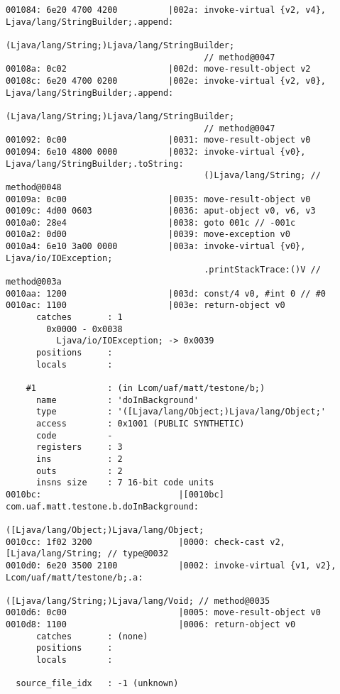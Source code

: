 \begin{lstlisting}
001084: 6e20 4700 4200          |002a: invoke-virtual {v2, v4}, Ljava/lang/StringBuilder;.append:
                                       (Ljava/lang/String;)Ljava/lang/StringBuilder;
                                       // method@0047
00108a: 0c02                    |002d: move-result-object v2
00108c: 6e20 4700 0200          |002e: invoke-virtual {v2, v0}, Ljava/lang/StringBuilder;.append:
                                       (Ljava/lang/String;)Ljava/lang/StringBuilder;
                                       // method@0047
001092: 0c00                    |0031: move-result-object v0
001094: 6e10 4800 0000          |0032: invoke-virtual {v0}, Ljava/lang/StringBuilder;.toString:
                                       ()Ljava/lang/String; // method@0048
00109a: 0c00                    |0035: move-result-object v0
00109c: 4d00 0603               |0036: aput-object v0, v6, v3
0010a0: 28e4                    |0038: goto 001c // -001c
0010a2: 0d00                    |0039: move-exception v0
0010a4: 6e10 3a00 0000          |003a: invoke-virtual {v0}, Ljava/io/IOException;
                                       .printStackTrace:()V // method@003a
0010aa: 1200                    |003d: const/4 v0, #int 0 // #0
0010ac: 1100                    |003e: return-object v0
      catches       : 1
        0x0000 - 0x0038
          Ljava/io/IOException; -> 0x0039
      positions     :
      locals        :

    #1              : (in Lcom/uaf/matt/testone/b;)
      name          : 'doInBackground'
      type          : '([Ljava/lang/Object;)Ljava/lang/Object;'
      access        : 0x1001 (PUBLIC SYNTHETIC)
      code          -
      registers     : 3
      ins           : 2
      outs          : 2
      insns size    : 7 16-bit code units
0010bc:                           |[0010bc] com.uaf.matt.testone.b.doInBackground:
                                            ([Ljava/lang/Object;)Ljava/lang/Object;
0010cc: 1f02 3200                 |0000: check-cast v2, [Ljava/lang/String; // type@0032
0010d0: 6e20 3500 2100            |0002: invoke-virtual {v1, v2}, Lcom/uaf/matt/testone/b;.a:
                                         ([Ljava/lang/String;)Ljava/lang/Void; // method@0035
0010d6: 0c00                      |0005: move-result-object v0
0010d8: 1100                      |0006: return-object v0
      catches       : (none)
      positions     :
      locals        :

  source_file_idx   : -1 (unknown)
\end{lstlisting}
